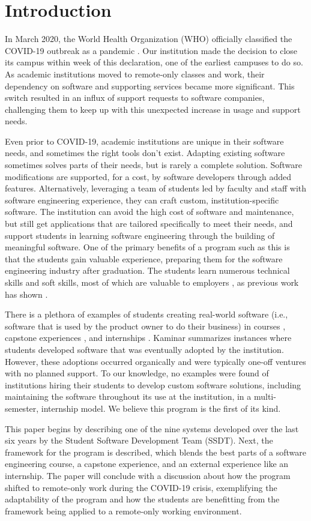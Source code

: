 \section{Introduction}

In March 2020, the World Health Organization (WHO) officially classified the COVID-19 outbreak as a pandemic \cite{covid}. Our institution made the decision to close its campus within week of this declaration, one of the earliest campuses to do so. As academic institutions moved to remote-only classes and work, their dependency on software and supporting services became more significant. This switch resulted in an influx of support requests to software companies, challenging them to keep up with this unexpected increase in usage and support needs.

Even prior to COVID-19, academic institutions are unique in their software needs, and sometimes the right tools don't exist. Adapting existing software sometimes solves parts of their needs, but is rarely a complete solution. Software modifications are supported, for a cost, by software developers through added features. Alternatively, leveraging a team of students led by faculty and staff with software engineering experience, they can craft custom, institution-specific software. The institution can avoid the high cost of software and maintenance, but still get applications that are tailored specifically to meet their needs, and support students in learning software engineering through the building of meaningful software. One of the primary benefits of a program such as this is that the students gain valuable experience, preparing them for the software engineering industry after graduation. The students learn numerous technical skills and soft skills, most of which are valuable to employers \cite{lavy2013soft}, as previous work has shown \cite{heggen2018hiring}.

There is a plethora of examples of students creating real-world software (i.e., software that is used by the product owner to do their business) in courses \cite{tadayon2004software}, capstone experiences \cite{capstone}, and internships \cite{rochesterfirstundergradsoftwareteam}. Kaminar \cite{kaminer_2014} summarizes instances where students developed software that was eventually adopted by the institution. However, these adoptions occurred organically and were typically one-off ventures with no planned support. To our knowledge, no examples were found of institutions hiring their students to develop custom software solutions, including maintaining the software throughout its use at the institution, in a multi-semester, internship model. We believe this program is the first of its kind.

This paper begins by describing one of the nine systems developed over the last six years by the Student Software Development Team (SSDT). Next, the framework for the program is described, which blends the best parts of a software engineering course, a capstone experience, and an external experience like an internship. The paper will conclude with a discussion about how the program shifted to remote-only work during the COVID-19 crisis, exemplifying the adaptability of the program and how the students are benefitting from the framework being applied to a remote-only working environment.

